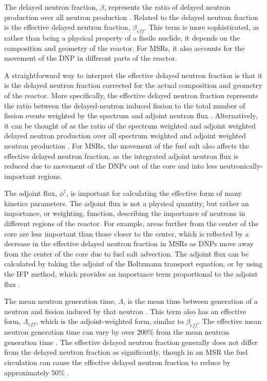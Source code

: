 The delayed neutron fraction, $\beta$, represents the ratio of delayed neutron production over all neutron production \cite{meulekamp2006calculating}.
Related to the delayed neutron fraction is the effective delayed neutron fraction, $\beta_{eff}$.
This term is more sophisticated, as rather than being a physical property of a fissile nuclide, it depends on the composition and geometry of the reactor.
For \glspl{MSR}, it also accounts for the movement of the \gls{DNP} in different parts of the reactor.

A straightforward way to interpret the effective delayed neutron fraction is that it is the delayed neutron fraction corrected for the actual composition and geometry of the reactor.
More specifically, the effective delayed neutron fraction represents the ratio between the delayed-neutron induced fission to the total number of fission events weighted by the spectrum and adjoint neutron flux \cite{romero2022calculation}.
Alternatively, it can be thought of as the ratio of the spectrum weighted and adjoint weighted delayed neutron production over all spectrum weighted and adjoint weighted neutron production \cite{meulekamp2006calculating}.
For \glspl{MSR}, the movement of the fuel salt also affects the effective delayed neutron fraction, as the integrated adjoint neutron flux is reduced due to movement of the \glspl{DNP} out of the core and into less neutronically-important regions.

The adjoint flux, $\phi^\dagger$, is important for calculating the effective form of many kinetics parameters.
The adjoint flux is not a physical quantity, but rather an importance, or weighting, function, describing the importance of neutrons in different regions of the reactor.
For example, areas further from the center of the core are less important than those closer to the center, which is reflected by a decrease in the effective delayed neutron fraction in \glspl{MSR} as \glspl{DNP} move away from the center of the core due to fuel salt advection.
The adjoint flux can be calculated by taking the adjoint of the Boltzmann transport equation, or by using the \gls{IFP} method, which provides an importance term proportional to the adjoint flux \cite{terranova2018adjoint, nauchi2010development, truchet2015computing}.

The mean neutron generation time, $\Lambda$, is the mean time between generation of a neutron and fission induced by that neutron \cite{romero2022calculation}.
This term also has an effective form, $\Lambda_{eff}$, which is the adjoint-weighted form, similar to $\beta_{eff}$.
The effective mean neutron generation time can vary by over 200\% from the mean neutron generation time \cite{verboomen2006monte}.
The effective delayed neutron fraction generally does not differ from the delayed neutron fraction as significantly, though in an \gls{MSR} the fuel circulation can cause the effective delayed neutron fraction to reduce by approximately 50\% \cite{aufiero2014calculating}.

